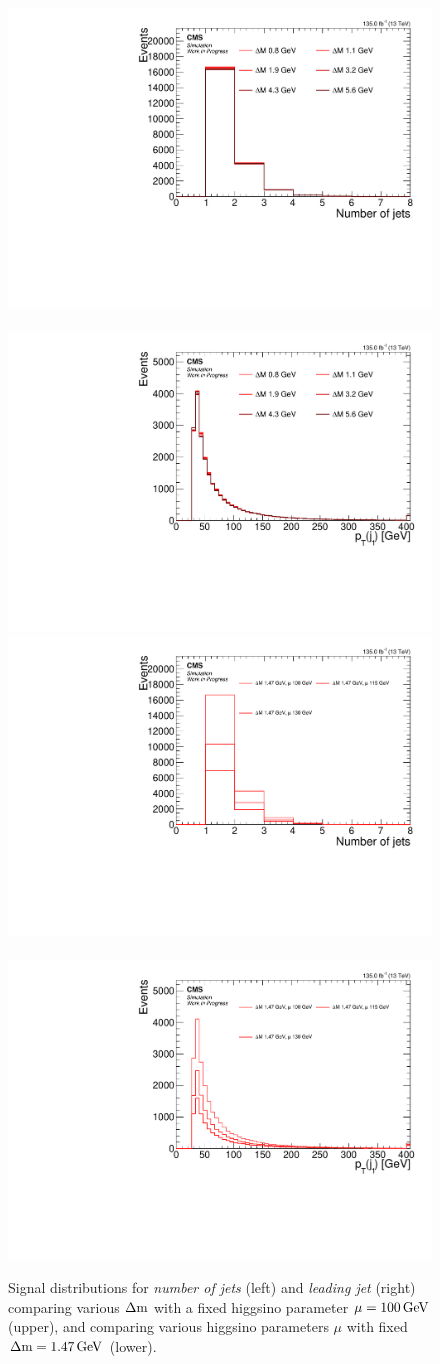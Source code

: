 \begin{figure}[h]
\centering
\includegraphics[width=0.48\linewidth]{plots/signal_common_distributions_fixed_mu/none_NJets.pdf} \,
\includegraphics[width=0.48\linewidth]{plots/signal_common_distributions_fixed_mu/none_LeadingJetPt.pdf}  \\
\includegraphics[width=0.48\linewidth]{plots/signal_common_distributions_fixed_dm/none_NJets.pdf} \,
\includegraphics[width=0.48\linewidth]{plots/signal_common_distributions_fixed_dm/none_LeadingJetPt.pdf}  \\
\caption[Signal \emph{number of jets} and \emph{leading jet \pt} distributions]{ Signal distributions for \emph{number of jets} (left) and \emph{leading jet \pt} (right) comparing various $\Delta\mathrm{m}$ with a fixed higgsino parameter $\mu=100\,\text{Ge\hspace{-.08em}V}$ (upper), and comparing various higgsino parameters $\mu$ with fixed $\Delta\mathrm{m}=1.47\,\text{Ge\hspace{-.08em}V}$ (lower).}
\label{fig:signal-njets-ljpt}
\end{figure}

